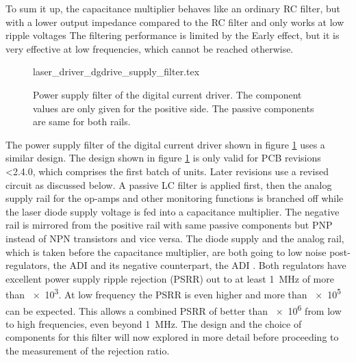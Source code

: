 To sum it up, the capacitance multiplier behaves like an ordinary RC filter, but with a lower output impedance compared to the RC filter and only works at low ripple voltages The filtering performance is limited by the Early effect, but it is very effective at low frequencies, which cannot be reached otherwise.
\begin{figure}[ht]
    \centering
        {laser_driver_dgdrive_supply_filter.tex}
    \caption{Power supply filter of the digital current driver. The component values are only given for the positive side. The passive components are same for both rails.}
    \label{fig:laser_driver_dgdrive_filter}
\end{figure}

The power supply filter of the digital current driver shown in figure \ref{fig:laser_driver_dgdrive_filter} uses a similar design. The design shown in figure \ref{fig:laser_driver_dgdrive_filter} is only valid for PCB revisions <2.4.0, which comprises the first batch of units. Later revisions use a revised circuit as discussed below. A passive LC filter is applied first, then the analog supply rail for the op-amps and other monitoring functions is branched off while the laser diode supply voltage is fed into a capacitance multiplier. The negative rail is mirrored from the positive rail with same passive components but PNP instead of NPN transistors and vice versa. The diode supply and the analog rail, which is taken before the capacitance multiplier, are both going to low noise post-regulators, the ADI  and its negative counterpart, the ADI . Both regulators have excellent power supply ripple rejection (PSRR) out to at least \qty{1}{\MHz} of more than \num{e3}. At low frequency the PSRR is even higher and more than \num{e5} can be expected. This allows a combined PSRR of better than \num{e6} from low to high frequencies, even beyond \qty{1}{\MHz}. The design and the choice of components for this filter will now explored in more detail before proceeding to the measurement of the rejection ratio.

